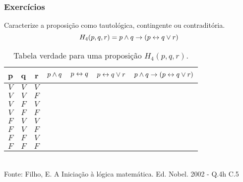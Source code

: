 %
\begin{frame}[t]
    \frametitle{Exercícios}
    \begin{exampleblock}{Caracterize a proposição como tautológica, contingente ou contraditória.}
        \begin{equation}
            H_4(p,q,r) = p \land q \rightarrow (p \leftrightarrow q \lor r)
        \end{equation}
    \end{exampleblock}
    \vspace{-4mm}
    \begin{table}[]
        \caption{Tabela verdade para uma proposição $H_4(p,q,r)$.}
        \label{tab:exercise-24}
        \begin{tabular}{|c|c|c|c|c|c|c|}
        \hline
        \rowcolor[HTML]{EFEFEF} 
        \textbf{p} & \textbf{q} & \textbf{r} & $p \land q$ & $p \leftrightarrow q$ & $p \leftrightarrow q \lor r$ & $p \land q \rightarrow (p \leftrightarrow q \lor r)$ \\ \hline
        $V$        & $V$        & $V$        &          &           &                 &                               \\ \hline
        $V$        & $V$        & $F$        &          &           &                 &                               \\ \hline
        $V$        & $F$        & $V$        &          &           &                 &                               \\ \hline
        $V$        & $F$        & $F$        &          &           &                 &                               \\ \hline
        $F$        & $V$        & $V$        &          &           &                 &                               \\ \hline
        $F$        & $V$        & $F$        &          &           &                 &                               \\ \hline
        $F$        & $F$        & $V$        &          &           &                 &                               \\ \hline
        $F$        & $F$        & $F$        &          &           &                 &                               \\ \hline
        \end{tabular}
        \\
        \centering \tiny{Fonte: Filho, E. A Iniciação à lógica matemática. Ed. Nobel. 2002 - Q.4h C.5}
        \end{table}
\end{frame}